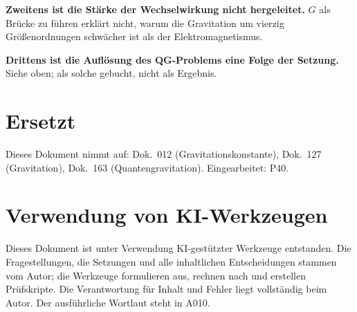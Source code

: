 \textbf{Zweitens ist die Stärke der Wechselwirkung nicht hergeleitet.} $G$ als
Brücke zu führen erklärt nicht, warum die Gravitation um vierzig
Größenordnungen schwächer ist als der Elektromagnetismus.

\textbf{Drittens ist die Auflösung des QG-Problems eine Folge der Setzung.}
Siehe oben; als solche gebucht, nicht als Ergebnis.

\section{Ersetzt}

Dieses Dokument nimmt auf: Dok.~012 (Gravitationskonstante), Dok.~127
(Gravitation), Dok.~163 (Quantengravitation). Eingearbeitet: P40.

\section{Verwendung von KI-Werkzeugen}

Dieses Dokument ist unter Verwendung KI-gestützter Werkzeuge entstanden. Die
Fragestellungen, die Setzungen und alle inhaltlichen Entscheidungen stammen vom
Autor; die Werkzeuge formulieren aus, rechnen nach und erstellen Prüfskripte.
Die Verantwortung für Inhalt und Fehler liegt vollständig beim Autor. Der
ausführliche Wortlaut steht in A010.

